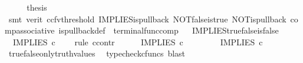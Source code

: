 \begin{isabellebody}
\ \ \isamarkupfalse%
\ \isamarkupfalse%
\ {\isacharquery}{\kern0pt}thesis\isanewline
\ \ \ \ \isamarkupfalse%
\ {\isacharparenleft}{\kern0pt}smt\ {\isacharparenleft}{\kern0pt}verit{\isacharcomma}{\kern0pt}\ ccfv{\isacharunderscore}{\kern0pt}threshold{\isacharparenright}{\kern0pt}\ IMPLIES{\isacharunderscore}{\kern0pt}is{\isacharunderscore}{\kern0pt}pullback\ NOT{\isacharunderscore}{\kern0pt}false{\isacharunderscore}{\kern0pt}is{\isacharunderscore}{\kern0pt}true\ NOT{\isacharunderscore}{\kern0pt}is{\isacharunderscore}{\kern0pt}pullback\ comp{\isacharunderscore}{\kern0pt}associative{}\ is{\isacharunderscore}{\kern0pt}pullback{\isacharunderscore}{\kern0pt}def\ \ terminal{\isacharunderscore}{\kern0pt}func{\isacharunderscore}{\kern0pt}comp{\isacharparenright}{\kern0pt}\isanewline
{}\isamarkupfalse%
%
\endisatagproof
{\isafoldproof}%
%
\isadelimproof
\ \isanewline
%
\endisadelimproof
\isanewline
{}\isamarkupfalse%
\ IMPLIES{\isacharunderscore}{\kern0pt}true{\isacharunderscore}{\kern0pt}false{\isacharunderscore}{\kern0pt}is{\isacharunderscore}{\kern0pt}false{\isacharcolon}{\kern0pt}\isanewline
\ \ {\isachardoublequoteopen}IMPLIES\ {\isasymcirc}\isactrlsub c\ \ {\isasymlangle}{\isasymt}{\isacharcomma}{\kern0pt}{\isasymf}{\isasymrangle}\ {\isacharequal}{\kern0pt}\ {\isasymf}{\isachardoublequoteclose}\isanewline
%
\isadelimproof
%
\endisadelimproof
%
\isatagproof
{}\isamarkupfalse%
{\isacharparenleft}{\kern0pt}rule\ ccontr{\isacharparenright}{\kern0pt}\ \ \isanewline
\ \ \isamarkupfalse%
\ {\isachardoublequoteopen}IMPLIES\ {\isasymcirc}\isactrlsub c\ {\isasymlangle}{\isasymt}{\isacharcomma}{\kern0pt}{\isasymf}{\isasymrangle}\ {\isasymnoteq}\ {\isasymf}{\isachardoublequoteclose}\isanewline
\ \ \isamarkupfalse%
\ \isamarkupfalse%
\ {\isachardoublequoteopen}IMPLIES\ {\isasymcirc}\isactrlsub c\ {\isasymlangle}{\isasymt}{\isacharcomma}{\kern0pt}{\isasymf}{\isasymrangle}\ {\isacharequal}{\kern0pt}\ {\isasymt}{\isachardoublequoteclose}\isanewline
\ \ \ \ \isamarkupfalse%
\ true{\isacharunderscore}{\kern0pt}false{\isacharunderscore}{\kern0pt}only{\isacharunderscore}{\kern0pt}truth{\isacharunderscore}{\kern0pt}values\ \isamarkupfalse%
\ {\isacharparenleft}{\kern0pt}typecheck{\isacharunderscore}{\kern0pt}cfuncs{\isacharcomma}{\kern0pt}\ blast{\isacharparenright}{\kern0pt}\isanewline
\ \ \isamarkupfalse%
\ \isamarkupfalse%

\end{isabellebody}
